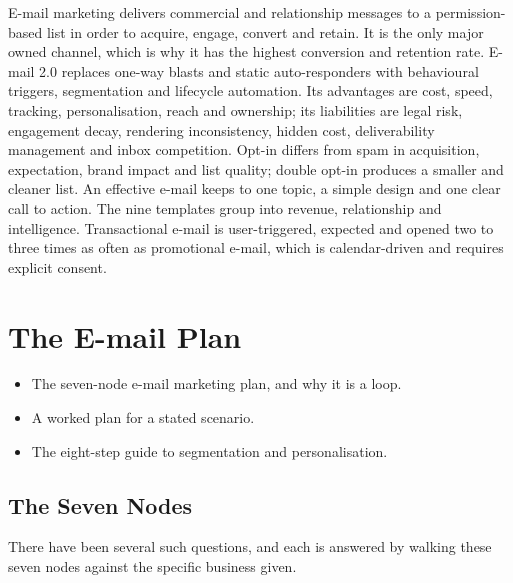 \begin{summarybox}
E-mail marketing delivers commercial and relationship messages to a
permission-based list in order to acquire, engage, convert and retain. It is the
only major owned channel, which is why it has the highest conversion and
retention rate. E-mail 2.0 replaces one-way blasts and static auto-responders
with behavioural triggers, segmentation and lifecycle automation. Its advantages
are cost, speed, tracking, personalisation, reach and ownership; its liabilities
are legal risk, engagement decay, rendering inconsistency, hidden cost,
deliverability management and inbox competition. Opt-in differs from spam in
acquisition, expectation, brand impact and list quality; double opt-in produces a
smaller and cleaner list. An effective e-mail keeps to one topic, a simple design
and one clear call to action. The nine templates group into revenue,
relationship and intelligence. Transactional e-mail is user-triggered, expected
and opened two to three times as often as promotional e-mail, which is
calendar-driven and requires explicit consent.
\end{summarybox}

\chapter{The E-mail Plan}


\begin{learningoutcomes}
\begin{itemize}
\item The seven-node e-mail marketing plan, and why it is a loop.
\item A worked plan for a stated scenario.
\item The eight-step guide to segmentation and personalisation.
\end{itemize}
\end{learningoutcomes}

\section{The Seven Nodes}

\begin{keybox}
There have been several such questions, and each is answered by walking these
seven nodes against the specific business given.
\end{keybox}

